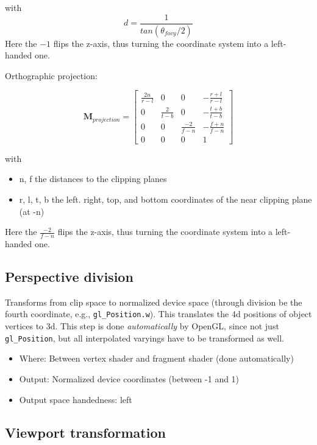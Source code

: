 \documentclass{scrartcl}
\begin{document}
        with 
        \[
        d = \frac{1}{tan (\theta_{fovy}/2)}
        \]
        Here the $-1$ flips the z-axis, thus turning the coordinate system into a left-handed one.
        
        Orthographic projection:
        
        \[
        \mathbf{M}_{projection} =
        \begin{bmatrix}
            \frac{2n}{r-l} & 0 & 0 & -\frac{r+l}{r-l} \\
            0 & \frac{2}{t-b} & 0 & -\frac{t+b}{t-b} \\
            0 & 0 & \frac{-2}{f-n} & -\frac{f+n}{f-n} \\
            0 & 0 & 0 & 1 
        \end{bmatrix}
        \]
        
        with
        \begin{itemize}
            \item n, f the distances to the clipping planes
            \item r, l, t, b the left. right, top, and bottom coordinates of the near clipping plane (at -n)
        \end{itemize}
        
        Here the $\frac{-2}{f-n} $ flips the z-axis, thus turning the coordinate system into a left-handed one.
        
    \subsection{Perspective division}
    
    Transforms from clip space to normalized device space (through division be the fourth coordinate, e.g., \texttt{gl\_Position.w}). This translates the 4d positions of object vertices to 3d. 
    This step is done \textit{automatically} by OpenGL, since not just \texttt{gl\_Position}, but all interpolated varyings have to be transformed as well.
    
    \begin{itemize}
        \item Where: Between vertex shader and fragment shader (done automatically)
        \item Output: Normalized device coordinates (between -1 and 1)
        \item Output space handedness: left
    \end{itemize}
        
    \subsection{Viewport transformation}
    
\end{document}
